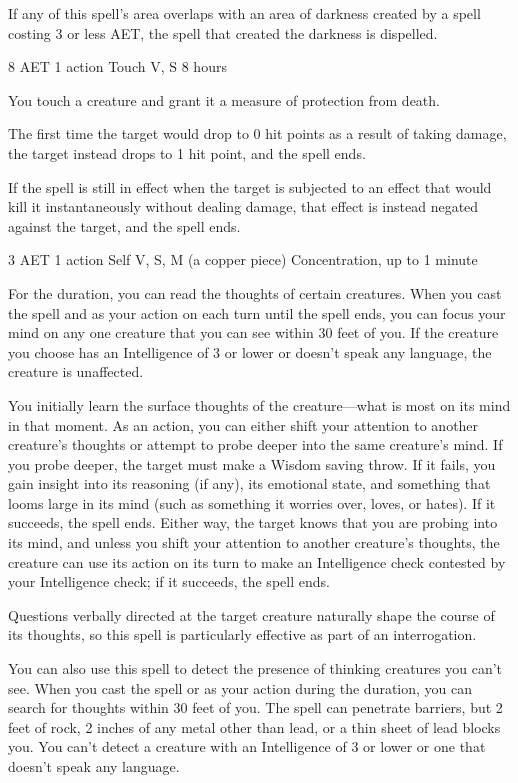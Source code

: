 If any of this spell's area overlaps with an area of darkness created by a spell costing 3 or less AET, the spell that created the darkness is dispelled.


{8 AET}
{1 action}
{Touch}
{V, S}
{8 hours}

You touch a creature and grant it a measure of protection from death.

The first time the target would drop to 0 hit points as a result of taking damage, the target instead drops to 1 hit point, and the spell ends.

If the spell is still in effect when the target is subjected to an effect that would kill it instantaneously without dealing damage, that effect is instead negated against the target, and the spell ends.


{3 AET}
{1 action}
{Self}
{V, S, M (a copper piece)}
{Concentration, up to 1 minute}

For the duration, you can read the thoughts of certain creatures. When you cast the spell and as your action on each turn until the spell ends, you can focus your mind on any one creature that you can see within 30 feet of you. If the creature you choose has an Intelligence of 3 or lower or doesn't speak any language, the creature is unaffected.

You initially learn the surface thoughts of the creature—what is most on its mind in that moment. As an action, you can either shift your attention to another creature's thoughts or attempt to probe deeper into the same creature's mind. If you probe deeper, the target must make a Wisdom saving throw. If it fails, you gain insight into its reasoning (if any), its emotional state, and something that looms large in its mind (such as something it worries over, loves, or hates). If it succeeds, the spell ends. Either way, the target knows that you are probing into its mind, and unless you shift your attention to another creature's thoughts, the creature can use its action on its turn to make an Intelligence check contested by your Intelligence check; if it succeeds, the spell ends.

Questions verbally directed at the target creature naturally shape the course of its thoughts, so this spell is particularly effective as part of an interrogation.

You can also use this spell to detect the presence of thinking creatures you can't see. When you cast the spell or as your action during the duration, you can search for thoughts within 30 feet of you. The spell can penetrate barriers, but 2 feet of rock, 2 inches of any metal other than lead, or a thin sheet of lead blocks you. You can't detect a creature with an Intelligence of 3 or lower or one that doesn't speak any language.

